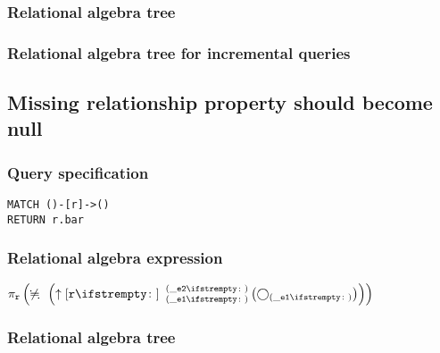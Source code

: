 \subsubsection*{Relational algebra tree}


\subsubsection*{Relational algebra tree for incremental queries}


\subsection{Missing relationship property should become null}

\subsubsection*{Query specification}

\begin{lstlisting}
MATCH ()-[r]->()
RETURN r.bar
\end{lstlisting}

\subsubsection*{Relational algebra expression}

$\projection{\var{r}} \left(\alldifferent{} \left(\expandout{r}{}{\_e1}{\_e2}{} \left(\getvertices{\_e1}{}\right)\right)\right)$

\subsubsection*{Relational algebra tree}

